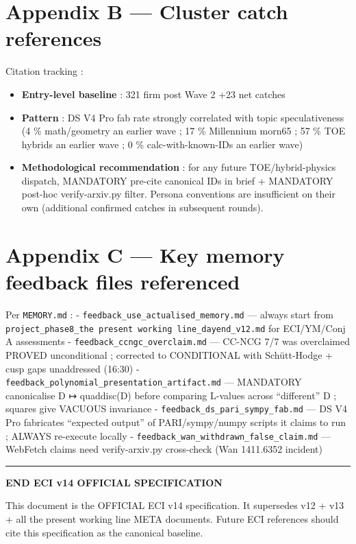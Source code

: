 \documentclass[
  11pt,
  a4paper,
]{article}
\providecommand{\tightlist}{\setlength{\itemsep}{0pt}\setlength{\parskip}{0pt}}
\providecommand{\tightlist}{%
  \setlength{\itemsep}{0pt}\setlength{\parskip}{0pt}}
\begin{document}
\hypertarget{appendix-b-cluster-catch-references}{%
\section{Appendix B --- Cluster catch references}\label{appendix-b-cluster-catch-references}}

Citation tracking :

\begin{itemize}
\tightlist
\item
  \textbf{Entry-level baseline} : 321 firm post Wave 2 +23 net catches
\item
  \textbf{Pattern} : DS V4 Pro fab rate strongly correlated with topic speculativeness (4 \% math/geometry an earlier wave ; 17 \% Millennium morn65 ; 57 \% TOE hybrids an earlier wave ; 0 \% calc-with-known-IDs an earlier wave)
\item
  \textbf{Methodological recommendation} : for any future TOE/hybrid-physics dispatch, MANDATORY pre-cite canonical IDs in brief + MANDATORY post-hoc verify-arxiv.py filter. Persona conventions are insufficient on their own (additional confirmed catches in subsequent rounds).
\end{itemize}

\hypertarget{appendix-c-key-memory-feedback-files-referenced}{%
\section{Appendix C --- Key memory feedback files referenced}\label{appendix-c-key-memory-feedback-files-referenced}}

Per \texttt{MEMORY.md} :
- \texttt{feedback\_use\_actualised\_memory.md} --- always start from \texttt{project\_phase8\_the present working line\_dayend\_v12.md} for ECI/YM/Conj A assessments
- \texttt{feedback\_ccngc\_overclaim.md} --- CC-NCG 7/7 was overclaimed PROVED unconditional ; corrected to CONDITIONAL with Schütt-Hodge + cusp gaps unaddressed (16:30)
- \texttt{feedback\_polynomial\_presentation\_artifact.md} --- MANDATORY canonicalise D ↦ quaddisc(D) before comparing L-values across ``different'' D ; squares give VACUOUS invariance
- \texttt{feedback\_ds\_pari\_sympy\_fab.md} --- DS V4 Pro fabricates ``expected output'' of PARI/sympy/numpy scripts it claims to run ; ALWAYS re-execute locally
- \texttt{feedback\_wan\_withdrawn\_false\_claim.md} --- WebFetch claims need verify-arxiv.py cross-check (Wan 1411.6352 incident)

\begin{center}\rule{0.5\linewidth}{0.5pt}\end{center}

\textbf{END ECI v14 OFFICIAL SPECIFICATION}

This document is the OFFICIAL ECI v14 specification. It supersedes v12 + v13 + all the present working line META documents. Future ECI references should cite this specification as the canonical baseline.
\end{document}
